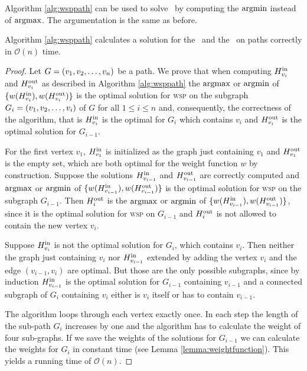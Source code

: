 Algorithm \ref{alg:wsppath} can be used to solve \minWSP\ by computing the $\argmin$ instead of $\argmax$. The argumentation is the same as before.

\begin{theorem}
	Algorithm \ref{alg:wsppath} calculates a solution for the \WSP\ and the \WISP\ on paths correctly in $\mathcal{O}(n)$ time.
\end{theorem}
\begin{proof}
	Let $G = \Vector[v]{n}$ be a path. We prove that when computing $\HPath{v_i}{in}$ and $\HPath{v_i}{out}$ as described in Algorithm \ref{alg:wsppath} the $\argmax$ or $\argmin$ of $\{ w(\HPath{v_i}{in}), w(\HPath{v_i}{out}) \}$ is the optimal solution for \textsc{wsp} on the subgraph $G_i = \Vector[v]{i}$ of $G$ for all $1 \leq i \leq n$ and, consequently, the correctness of the algorithm, that is $\HPath{v_i}{in}$ is the optimal for $G_i$ which contains $v_i$ and $\HPath{v_i}{out}$ is the optimal solution for $G_{i-1}$.\medskip
	
	For the first vertex $v_1$, $\HPath{v_1}{in}$ is initialized as the graph just containing $v_1$ and $\HPath{v_1}{out}$ is the empty set, which are both optimal for the weight function $w$ by construction. Suppose the solutions  $\HPath{v_{i-1}}{in}$ and $\HPath{v_{i-1}}{out}$ are correctly computed and $\argmax$ or $\argmin$ of $\{ w(\HPath{v_{i-1}}{in}), w(\HPath{v_{i-1}}{out}) \}$ is the optimal solution for \textsc{wsp} on the subgraph $G_{i-1}$. Then $\HPath{i}{out}$ is the $\argmax$ or $\argmin$ of $\{ w(\HPath{v_{i-1}}{in}), w(\HPath{v_{i-1}}{out}) \}$, since it is the optimal solution for \textsc{wsp} on $G_{i-1}$ and $\HPath{i}{out}$ is not allowed to contain the new vertex $v_i$.\medskip
	
	Suppose $\HPath{v_i}{in}$ is not the optimal solution for $G_i$, which contains $v_i$. Then neither the graph just containing $v_i$ nor $\HPath{v_{i-1}}{in}$ extended by adding the vertex $v_i$ and the edge $(v_{i-1}, v_i)$ are optimal. But those are the only possible subgraphs, since by induction $\HPath{v_{i-1}}{in}$ is the optimal solution for $G_{i-1}$ containing $v_{i-1}$ and a connected subgraph of $G_i$ containing $v_i$ either is $v_i$ itself or has to contain $v_{i-1}$.\medskip
	
	The algorithm loops through each vertex exactly once. In each step the length of the sub-path $G_i$ increases by one and the algorithm has to calculate the weight of four sub-graphs. If we save the weights of the solutions for $G_{i-1}$ we can calculate the weights for $G_i$ in constant time (see Lemma \ref{lemma:weightfunction}). This yields a running time of $\mathcal{O}(n)$.
\end{proof}


